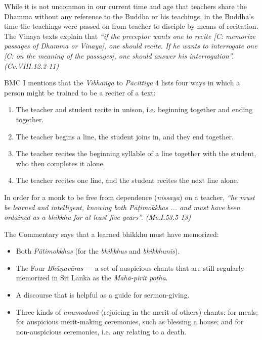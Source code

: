 While it is not uncommon in our current time and age that teachers share the Dhamma without any reference to the Buddha or his teachings, in the Buddha's time the teachings were passed on from teacher to disciple by means of recitation. The Vinaya texts explain that \textit{``if the preceptor wants one to recite [C: memorize passages of Dhamma or Vinaya], one should recite. If he wants to interrogate one [C: on the meaning of the passages], one should answer his interrogation''. (Cv.VIII.12.2-11)}

BMC I mentions that the \textit{Vibhaṅga} to \textit{Pācittiya} 4 lists four ways in which a person might be trained to be a reciter of a text:

\begin{enumerate}
  \item The teacher and student recite in unison, i.e. beginning together and ending together.
  \item The teacher begins a line, the student joins in, and they end together.
  \item The teacher recites the beginning syllable of a line together with the student, who then completes it alone.
  \item The teacher recites one line, and the student recites the next line alone.
\end{enumerate}

In order for a monk to be free from dependence (\textit{nissaya}) on a teacher, \textit{``he must be learned and intelligent, knowing both Pāṭimokkhas ... and must have been ordained as a bhikkhu for at least five years''. (Mv.I.53.5-13)}

The Commentary says that a learned bhikkhu must have memorized:

\begin{itemize}
  \item Both \textit{Pātimokkhas} (for the \textit{bhikkhus} and \textit{bhikkhunīs}).
  \item The Four \textit{Bhāṇavāras} — a set of auspicious chants that are still regularly memorized in Sri Lanka as the \textit{Mahā-pirit poṭha}.
  \item A discourse that is helpful as a guide for sermon-giving.
  \item Three kinds of \textit{anumodanā} (rejoicing in the merit of others) chants: for meals; for auspicious merit-making ceremonies, such as blessing a house; and for non-auspicious ceremonies, i.e. any relating to a death.
\end{itemize}

